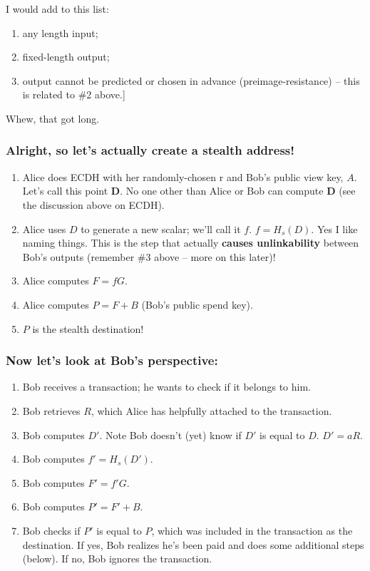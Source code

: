 I would add to this list:
	\begin{enumerate}
		\item any length input;
		\item fixed-length output;
		\item output cannot be predicted or chosen in advance (preimage-resistance) -- this is related to \#2 above.]
	\end{enumerate}
Whew, that got long.

\subsubsection{Alright, so let's actually create a stealth address!}
	\begin{enumerate}
		\item Alice does ECDH with her randomly-chosen r and Bob's public view key, \(A\). Let's call this point \textbf{D}. No one other than Alice or Bob can compute \textbf{D} (see the discussion above on ECDH).
		\item Alice uses \(D\) to generate a new scalar; we'll call it \(f\). \(f = H_s(D)\). Yes I like naming things. This is the step that actually \textbf{causes unlinkability} between Bob's outputs (remember \#3 above -- more on this later)!
		\item Alice computes \(F = fG\).
		\item Alice computes \(P = F + B\) (Bob's public spend key).
		\item \(P\) is the stealth destination!
	\end{enumerate}
\subsubsection{Now let's look at Bob's perspective:}
	\begin{enumerate}
		\item Bob receives a transaction; he wants to check if it belongs to him.
		\item Bob retrieves \(R\), which Alice has helpfully attached to the transaction.
		\item Bob computes \(D'\). Note Bob doesn't (yet) know if \(D'\) is equal to \(D\). \(D' = aR\).
		\item Bob computes \(f' = H_s(D')\).
		\item Bob computes \(F' = f'G\).
		\item Bob computes \(P' = F' + B\).
		\item Bob checks if \(P'\) is equal to \(P\), which was included in the transaction as the destination. If yes, Bob realizes he's been paid and does some additional steps (below). If no, Bob ignores the transaction.
	\end{enumerate}
